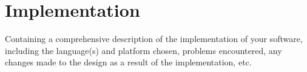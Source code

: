 \chapter{Implementation}

Containing a comprehensive description of the implementation of your software, including the language(s) and platform chosen, problems encountered, any changes made to the design as a result of the implementation, etc.